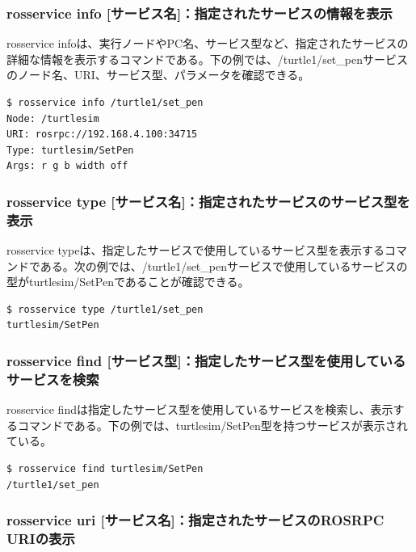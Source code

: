 \subsubsection{rosservice info [サービス名]：指定されたサービスの情報を表示}

rosservice infoは、実行ノードやPC名、サービス型など、指定されたサービスの詳細な情報を表示するコマンドである。下の例では、/turtle1/set\_penサービスのノード名、URI、サービス型、パラメータを確認できる。

\begin{lstlisting}[language=ROS]
$ rosservice info /turtle1/set_pen
Node: /turtlesim
URI: rosrpc://192.168.4.100:34715
Type: turtlesim/SetPen
Args: r g b width off
\end{lstlisting}

\subsubsection{rosservice type [サービス名]：指定されたサービスのサービス型を表示}

rosservice typeは、指定したサービスで使用しているサービス型を表示するコマンドである。次の例では、/turtle1/set\_penサービスで使用しているサービスの型がturtlesim/SetPenであることが確認できる。

\begin{lstlisting}[language=ROS]
$ rosservice type /turtle1/set_pen
turtlesim/SetPen
\end{lstlisting}

\subsubsection{rosservice find [サービス型]：指定したサービス型を使用しているサービスを検索}

rosservice findは指定したサービス型を使用しているサービスを検索し、表示するコマンドである。下の例では、turtlesim/SetPen型を持つサービスが表示されている。

\begin{lstlisting}[language=ROS]
$ rosservice find turtlesim/SetPen
/turtle1/set_pen
\end{lstlisting}

\subsubsection{rosservice uri [サービス名]：指定されたサービスのROSRPC URIの表示}

